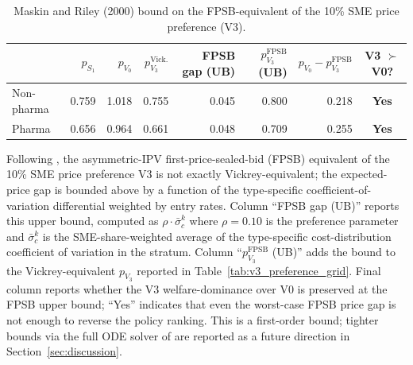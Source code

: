 \begin{table}[!htbp]
\centering
\begin{threeparttable}
\caption{Maskin and Riley (2000) bound on the FPSB-equivalent of the 10\% SME price preference (V3).}
\label{tab:maskin_riley_bound}
\small
\setlength{\tabcolsep}{4pt}
\begin{tabular}{lrrrrrrc}
\toprule
 & $p_{S_1}$ & $p_{V_0}$ & $p_{V_3}^{\text{Vick.}}$ & FPSB gap (UB) & $p_{V_3}^{\text{FPSB}}$ (UB) & $p_{V_0} - p_{V_3}^{\text{FPSB}}$ & V3 $\succ$ V0? \\
\midrule
Non-pharma & 0.759 & 1.018 & 0.755 & 0.045 & 0.800 & 0.218 & \textbf{Yes} \\
Pharma & 0.656 & 0.964 & 0.661 & 0.048 & 0.709 & 0.255 & \textbf{Yes} \\
\bottomrule
\end{tabular}
\begin{tablenotes}[flushleft]\footnotesize
\item Following \citet{maskinriley2000}, the asymmetric-IPV first-price-sealed-bid (FPSB) equivalent of the 10\% SME price preference V3 is not exactly Vickrey-equivalent; the expected-price gap is bounded above by a function of the type-specific coefficient-of-variation differential weighted by entry rates. Column ``FPSB gap (UB)'' reports this upper bound, computed as $\rho \cdot \bar\sigma_c^k$ where $\rho = 0.10$ is the preference parameter and $\bar\sigma_c^k$ is the SME-share-weighted average of the type-specific cost-distribution coefficient of variation in the stratum. Column ``$p_{V_3}^{\text{FPSB}}$ (UB)'' adds the bound to the Vickrey-equivalent $p_{V_3}$ reported in Table~\ref{tab:v3_preference_grid}. Final column reports whether the V3 welfare-dominance over V0 is preserved at the FPSB upper bound; ``Yes'' indicates that even the worst-case FPSB price gap is not enough to reverse the policy ranking. This is a first-order bound; tighter bounds via the full ODE solver of \citet{lebrun1999} are reported as a future direction in Section~\ref{sec:discussion}.
\end{tablenotes}
\end{threeparttable}
\end{table}
